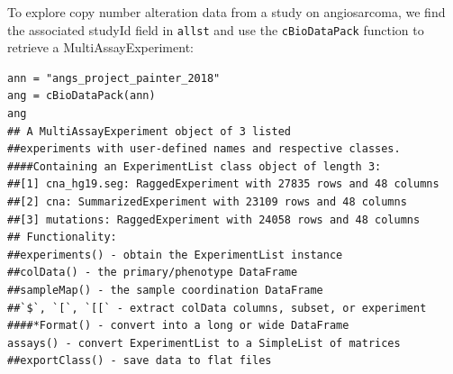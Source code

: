 \documentclass[graybox]{svmult}
\begin{document}

To explore copy number alteration data from a study on angiosarcoma,
we find the associated studyId field in \texttt{allst} and use the \texttt{cBioDataPack} function
to retrieve a MultiAssayExperiment:

\begin{shaded}
\begin{verbatim}
ann = "angs_project_painter_2018"
ang = cBioDataPack(ann)
ang
## A MultiAssayExperiment object of 3 listed
##experiments with user-defined names and respective classes.
####Containing an ExperimentList class object of length 3:
##[1] cna_hg19.seg: RaggedExperiment with 27835 rows and 48 columns
##[2] cna: SummarizedExperiment with 23109 rows and 48 columns
##[3] mutations: RaggedExperiment with 24058 rows and 48 columns
## Functionality:
##experiments() - obtain the ExperimentList instance
##colData() - the primary/phenotype DataFrame
##sampleMap() - the sample coordination DataFrame
##`$`, `[`, `[[` - extract colData columns, subset, or experiment
####*Format() - convert into a long or wide DataFrame
assays() - convert ExperimentList to a SimpleList of matrices
##exportClass() - save data to flat files
\end{verbatim}
\end{shaded}
\end{document}
